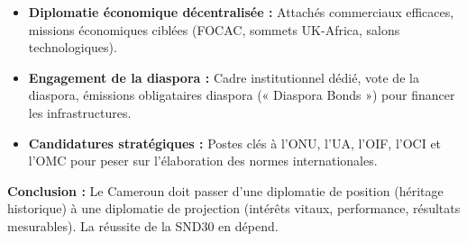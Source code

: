 \documentclass[11pt]{article}
\newcommand{\cle}[1]{{\popxbold\color{popdark}#1}}
\begin{document}
\begin{exoresolu}
\begin{enumerate}
\begin{itemize}
\begin{itemize}
                        \item \textbf{Diplomatie économique décentralisée :} Attachés commerciaux efficaces, missions économiques ciblées (FOCAC, sommets UK-Africa, salons technologiques).
                        \item \textbf{Engagement de la diaspora :} Cadre institutionnel dédié, vote de la diaspora, émissions obligataires diaspora (« Diaspora Bonds ») pour financer les infrastructures.
                        \item \textbf{Candidatures stratégiques :} Postes clés à l'ONU, l'UA, l'OIF, l'OCI et l'OMC pour peser sur l'élaboration des normes internationales.
                    \end{itemize}
            \end{itemize}
    \end{enumerate}
    \textbf{Conclusion :} Le Cameroun doit passer d'une \cle{diplomatie de position} (héritage historique) à une \cle{diplomatie de projection} (intérêts vitaux, performance, résultats mesurables). La réussite de la SND30 en dépend.
\end{exoresolu}
\end{document}
